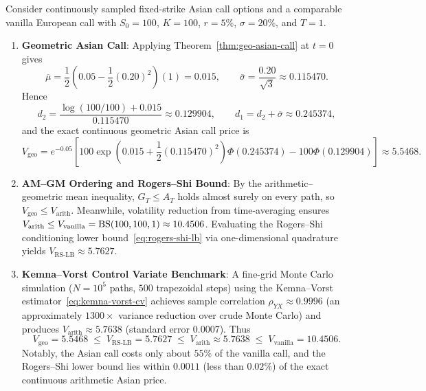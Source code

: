 \begin{example}\label{ex:asian-comparison}
    Consider continuously sampled fixed-strike Asian call options and a comparable vanilla European call with $S_0 = 100$, $K = 100$, $r = 5\%$, $\sigma = 20\%$, and $T = 1$.
    \begin{enumerate}
        \item \textbf{Geometric Asian Call}: Applying Theorem~\ref{thm:geo-asian-call} at $t = 0$ gives
        \[
        \overline{\mu} = \frac{1}{2}\left(0.05 - \frac{1}{2}(0.20)^2\right)(1) = 0.015, \qquad \overline{\sigma} = \frac{0.20}{\sqrt{3}} \approx 0.115470.
        \]
        Hence
        \[
        d_2 = \frac{\log(100/100) + 0.015}{0.115470} \approx 0.129904, \qquad d_1 = d_2 + \overline{\sigma} \approx 0.245374,
        \]
        and the exact continuous geometric Asian call price is
        \[
        V_{\mathrm{geo}} = e^{-0.05}\left[100\exp\!\left(0.015 + \frac{1}{2}(0.115470)^2\right)\Phi(0.245374) - 100\Phi(0.129904)\right] \approx 5.5468.
        \]
        \item \textbf{AM--GM Ordering and Rogers--Shi Bound}: By the arithmetic--geometric mean inequality, $G_T \le A_T$ holds almost surely on every path, so $V_{\mathrm{geo}} \le V_{\mathrm{arith}}$. Meanwhile, volatility reduction from time-averaging ensures $V_{\mathrm{arith}} \le V_{\mathrm{vanilla}} = \operatorname{BS}(100, 100, 1) \approx 10.4506$. Evaluating the Rogers--Shi conditioning lower bound~\eqref{eq:rogers-shi-lb} via one-dimensional quadrature yields $V_{\mathrm{RS\text{-}LB}} \approx 5.7627$.
        \item \textbf{Kemna--Vorst Control Variate Benchmark}: A fine-grid Monte Carlo simulation ($N = 10^5$ paths, $500$ trapezoidal steps) using the Kemna--Vorst estimator~\eqref{eq:kemna-vorst-cv} achieves sample correlation $\rho_{YX} \approx 0.9996$ (an approximately $1300\times$ variance reduction over crude Monte Carlo) and produces $V_{\mathrm{arith}} \approx 5.7638$ (standard error $0.0007$). Thus
        \[
        V_{\mathrm{geo}} = 5.5468 \;\le\; V_{\mathrm{RS\text{-}LB}} = 5.7627 \;\le\; V_{\mathrm{arith}} \approx 5.7638 \;\le\; V_{\mathrm{vanilla}} = 10.4506.
        \]
        Notably, the Asian call costs only about $55\%$ of the vanilla call, and the Rogers--Shi lower bound lies within $0.0011$ (less than $0.02\%$) of the exact continuous arithmetic Asian price.
    \end{enumerate}
\end{example}

